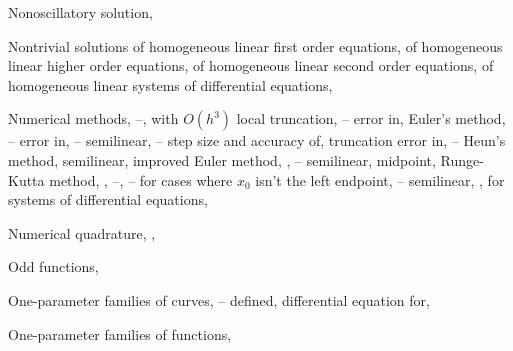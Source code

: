 \begin{theindex}
  \item Nonoscillatory solution, \pageref{exer:7.5.21}

  \item Nontrivial solutions
    \subitem of homogeneous linear first order equations, \pageref{eq:2.1.1}
    \subitem of homogeneous linear higher order equations, \pageref{eq:9.1.2}
    \subitem of homogeneous linear second order equations, \pageref{thmtype:5.1.1}
    \subitem of homogeneous linear systems of differential equations, \pageref{eq:10.3.1}

  \item Numerical methods, \pageref{eq:3.1.1}--\pageref{exer:3.3.28}, \pageref{exer:10.1.1}
    \subitem with $O(h^{3})$ local truncation, \pageref{eq:3.2.7}--\pageref{exer:3.2.1}
    \subitem error in, \pageref{eq:3.1.1}
    \subitem Euler's method, \pageref{eq:3.1.2}--\pageref{exer:3.1.23}
      \subsubitem error in, \pageref{example:3.1.2}--\pageref{eq:3.1.19}
      \subsubitem semilinear, \pageref{eq:3.1.19}--\pageref{exer:3.1.1}
      \subsubitem step size and accuracy of, \pageref{eq:3.1.6}
      \subsubitem truncation error in, \pageref{table:3.1.4}--\pageref{eq:3.1.18}
    \subitem Heun's method, \pageref{eq:3.2.13}
      \subsubitem semilinear, \pageref{exer:3.1.1}
    \subitem improved Euler method, \pageref{exer:3.1.1}, \pageref{eq:3.2.1}--\pageref{example:3.2.4}
      \subsubitem semilinear, \pageref{example:3.2.4}
    \subitem midpoint, \pageref{exer:3.2.1}
    \subitem Runge-Kutta method, \pageref{example:3.1.3}, \pageref{exer:3.1.1} \pageref{eq:3.3.1}--\pageref{exer:3.3.28}, \pageref{example:10.1.7}--\pageref{exer:10.1.1}
      \subsubitem for cases where $x_{0}$ isn't the left endpoint, \pageref{eq:3.3.3}--\pageref{exer:3.3.1}
      \subsubitem semilinear, \pageref{exer:3.1.1}, \pageref{example:3.3.4}
    \subitem for systems of differential equations, \pageref{exer:10.1.1}

  \item Numerical quadrature, \pageref{exer:3.2.32}, \pageref{exer:3.3.28} 

  \item Odd functions, \pageref{example:11.2.2}

  \item One-parameter families of curves, \pageref{eq:4.5.1}--\pageref{example:4.5.7}
    \subitem defined, \pageref{thmtype:4.5.1}
    \subitem differential equation for, \pageref{thmtype:4.5.2}

  \item One-parameter families of functions, \pageref{eq:2.1.3}


\end{theindex}
